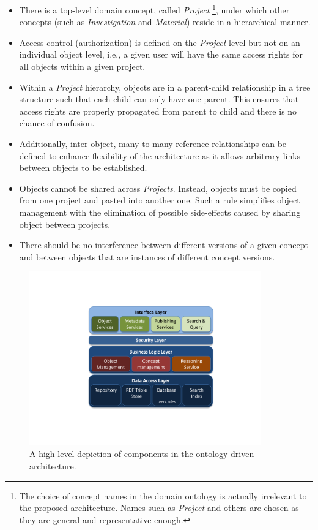 \documentclass{elsarticle}
\begin{document}
\begin{itemize}
\item There is a top-level domain concept, called \emph{Project}
\footnote{The choice of concept names in the domain ontology is actually
irrelevant to the proposed architecture. Names such as \emph{Project}
and others are chosen as they are general and representative enough.},
under which other concepts (such as \emph{Investigation} and
\emph{Material}) reside in a hierarchical manner.

\item Access control (authorization) is defined on the \emph{Project}
level but not on an individual object level, i.e., a given user will have
the same access rights for all objects within a given project.

\item Within a \emph{Project} hierarchy, objects are in
a parent-child relationship in a tree structure such that
each child can only have one parent. This ensures that
access rights are properly propagated from parent to
child and there is no chance of confusion.

\item Additionally, inter-object, many-to-many reference
relationships can be defined to enhance flexibility of the
architecture as it allows arbitrary links between objects
to be established.

\item Objects cannot be shared across \emph{Projects}. Instead,
objects must be copied from one project and pasted into another one.
Such a rule simplifies object management with the elimination of
possible side-effects caused by sharing object between projects.

\item There should be no interference between different
versions of a given concept and between objects that are instances of
different concept versions.
\end{itemize}

\begin{figure}[htb]
\centering
\includegraphics[trim = 60mm 30mm 50mm 36mm, clip,height=75mm]{architecture.pdf}
\vspace{-16pt} \caption{A high-level depiction of components in the ontology-driven
architecture.}\label{fig:arch}
\end{figure}
\end{document}
